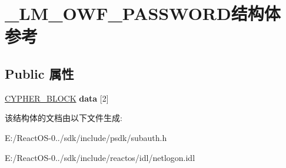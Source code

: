 \hypertarget{struct___l_m___o_w_f___p_a_s_s_w_o_r_d}{}\section{\+\_\+\+L\+M\+\_\+\+O\+W\+F\+\_\+\+P\+A\+S\+S\+W\+O\+R\+D结构体 参考}
\label{struct___l_m___o_w_f___p_a_s_s_w_o_r_d}
\subsection*{Public 属性}
\begin{DoxyCompactItemize}
\item 
\mbox{\label{struct___l_m___o_w_f___p_a_s_s_w_o_r_d_a4d6c4b52fa11589c0ec3e6e1a0a9d165}} 
\hyperlink{struct___c_y_p_h_e_r___b_l_o_c_k}{C\+Y\+P\+H\+E\+R\+\_\+\+B\+L\+O\+CK} {\bfseries data} \mbox{[}2\mbox{]}
\end{DoxyCompactItemize}


该结构体的文档由以下文件生成\+:\begin{DoxyCompactItemize}
\item 
E\+:/\+React\+O\+S-\/0../sdk/include/psdk/subauth.\+h\item 
E\+:/\+React\+O\+S-\/0../sdk/include/reactos/idl/netlogon.\+idl\end{DoxyCompactItemize}
